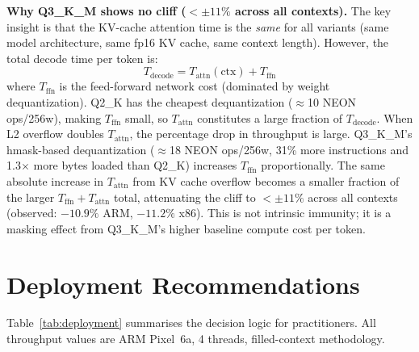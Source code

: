 \documentclass[conference]{IEEEtran}
\begin{document}
\textbf{Why Q3\_K\_M shows no cliff ($<\pm11\%$ across all contexts).}
The key insight is that the KV-cache attention time is the \emph{same} for all variants
(same model architecture, same fp16 KV cache, same context length).
However, the total decode time per token is:
\[T_{\text{decode}} = T_{\text{attn}}(\text{ctx}) + T_{\text{ffn}}\]
where $T_{\text{ffn}}$ is the feed-forward network cost (dominated by weight dequantization).
Q2\_K has the cheapest dequantization ($\approx$10 NEON ops/256w), making $T_{\text{ffn}}$
small, so $T_{\text{attn}}$ constitutes a large fraction of $T_{\text{decode}}$.
When L2 overflow doubles $T_{\text{attn}}$, the percentage drop in throughput is large.
Q3\_K\_M's hmask-based dequantization ($\approx$18 NEON ops/256w, 31\% more instructions
and 1.3$\times$ more bytes loaded than Q2\_K) increases $T_{\text{ffn}}$ proportionally.
The same absolute increase in $T_{\text{attn}}$ from KV cache overflow
becomes a smaller fraction of the larger $T_{\text{ffn}}+T_{\text{attn}}$ total,
attenuating the cliff to $<\pm11\%$ across all contexts (observed: $-10.9\%$ ARM,
$-11.2\%$ x86).
This is not intrinsic immunity; it is a masking effect from Q3\_K\_M's higher
baseline compute cost per token.

\section{Deployment Recommendations}
\label{sec:deployment}

Table~\ref{tab:deployment} summarises the decision logic for practitioners.
All throughput values are ARM Pixel~6a, 4 threads, filled-context methodology.
\end{document}
